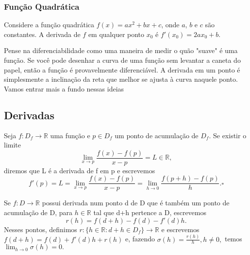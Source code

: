 \documentclass[Analysis/analysis_notes.tex]{subfiles}
\begin{document}
\subsubsection{Função Quadrática}

Considere a função quadrática $f(x) = ax^2 + bx + c$, onde $a$, $b$ e $c$ são constantes. A derivada de $f$ em qualquer ponto $x_0$ é $f'(x_0) = 2ax_0 + b$.

Pense na diferenciabilidade como uma maneira de medir o quão "suave" é uma função. Se você pode desenhar a curva de uma função sem levantar a caneta do papel, então a função é provavelmente diferenciável. A derivada em um ponto é simplesmente a inclinação da reta que melhor se ajusta à curva naquele ponto.
Vamos entrar mais a fundo nessas ideias

\subsection{Derivadas}
\begin{def*}
	Seja \(f:D_{f}\rightarrow \mathbb{R}\) uma fun\c cão e \(p\in D_{f}\) um ponto de
	acumula\c cão de \(D_{f}\). Se existir o limite
	\[
		\lim_{x\to p}\frac{f(x)-f(p)}{x-p} = L\in \mathbb{R},
	\]
	diremos que L é a derivada de f em p e escrevemos
	\[
		f'(p) = L = \lim_{x\to p}\frac{f(x)-f(p)}{x-p}=\lim_{h\to 0}\frac{f(p+h)-f(p)}{h}. \square
	\]
\end{def*}

Se \(f:D\rightarrow \mathbb{R}\) possui derivada num ponto d de D que é também um
ponto de acumula\c cão de D, para \(h\in \mathbb{R}\) tal que d+h pertence a D, escrevemos
\[
	r(h) = f(d+h)-f(d)-f'(d)h.
\]
Nesses pontos, definimos \(r:\{h\in \mathbb{R}: d+h\in D_{f}\}\rightarrow \mathbb{R}\)
e escrevemos \(f(d+h) = f(d)+f'(d)h + r(h)\) e, fazendo \(\sigma (h) = \frac{r(h)}{h}, h\neq 0,\)
temos \(\lim_{h\to 0}\sigma (h)=0.\)
\end{document}
